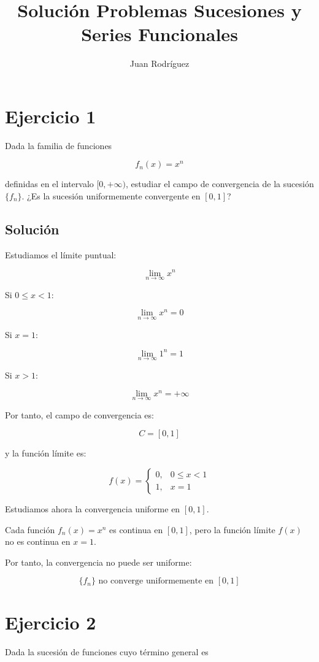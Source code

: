 \documentclass[fleqn]{article}
\title{Solución Problemas Sucesiones y Series Funcionales}
\author{Juan Rodríguez}
\begin{document}
\maketitle
\section{Ejercicio 1}
	Dada la familia de funciones

	\[
	f_n(x)=x^n
	\]

	definidas en el intervalo $[0,+\infty)$, estudiar el campo de convergencia de la sucesión $\{f_n\}$.
	¿Es la sucesión uniformemente convergente en $[0,1]$?

	\subsection{Solución}

	Estudiamos el límite puntual:

	\[
	\lim_{n\to\infty}x^n
	\]

	Si $0\leq x<1$:

	\[
	\lim_{n\to\infty}x^n=0
	\]

	Si $x=1$:

	\[
	\lim_{n\to\infty}1^n=1
	\]

	Si $x>1$:

	\[
	\lim_{n\to\infty}x^n=+\infty
	\]

	Por tanto, el campo de convergencia es:

	\[
	\boxed{C=[0,1]}
	\]

	y la función límite es:

	\[
	f(x)=
	\begin{cases}
	0, & 0\leq x<1 \\[1mm]
	1, & x=1
	\end{cases}
	\]

	Estudiamos ahora la convergencia uniforme en $[0,1]$.

	Cada función $f_n(x)=x^n$ es continua en $[0,1]$, pero la función límite $f(x)$ no es continua en $x=1$.

	Por tanto, la convergencia no puede ser uniforme:

	\[
	\boxed{
	\{f_n\}\text{ no converge uniformemente en }[0,1]
	}
	\]

\section{Ejercicio 2}
	Dada la sucesión de funciones cuyo término general es
\end{document}
